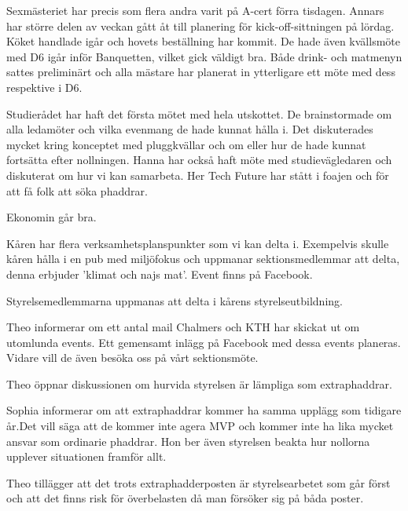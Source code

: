 \documentclass[10pt]{article}
\begin{document}
\begin{paragrafer}
\begin{paragrafer}
Sexmästeriet har precis som flera andra varit på A-cert förra tisdagen. Annars har större delen av veckan gått åt till planering för kick-off-sittningen på lördag. Köket handlade igår och hovets beställning har kommit. De hade även kvällsmöte med D6 igår inför Banquetten, vilket gick väldigt bra. Både drink- och matmenyn sattes preliminärt och alla mästare har planerat in ytterligare ett möte med dess respektive i D6.

Studierådet har haft det första mötet med hela utskottet. De brainstormade om alla ledamöter och vilka evenmang de hade kunnat hålla i. Det diskuterades mycket kring konceptet med pluggkvällar och om eller hur de hade kunnat fortsätta efter nollningen. Hanna har också haft möte med studievägledaren och diskuterat om hur vi kan samarbeta. Her Tech Future har stått i foajen och för att få folk att söka phaddrar. 

 
Ekonomin går bra.


Kåren har flera verksamhetsplanspunkter som vi kan delta i.
Exempelvis skulle kåren hålla i en pub med miljöfokus och uppmanar sektionsmedlemmar att delta, denna erbjuder 'klimat och najs mat'. Event finns på Facebook.

Styrelsemedlemmarna uppmanas att delta i kårens styrelseutbildning.


Theo informerar om ett antal mail Chalmers och KTH har skickat ut om utomlunda events. Ett gemensamt inlägg på Facebook med dessa events planeras. Vidare vill de även besöka oss på vårt sektionsmöte.

\end{paragrafer}


Theo öppnar diskussionen om hurvida styrelsen är lämpliga som extraphaddrar.

Sophia informerar om att extraphaddrar kommer ha samma upplägg som tidigare år.Det vill säga att de kommer inte agera MVP och kommer inte ha lika mycket ansvar som ordinarie phaddrar. Hon ber även styrelsen beakta hur nollorna upplever situationen framför allt.

Theo tillägger att det trots extraphadderposten är styrelsearbetet som går först och att det finns risk för överbelasten då man försöker sig på båda poster.


\end{paragrafer}
\end{document}
